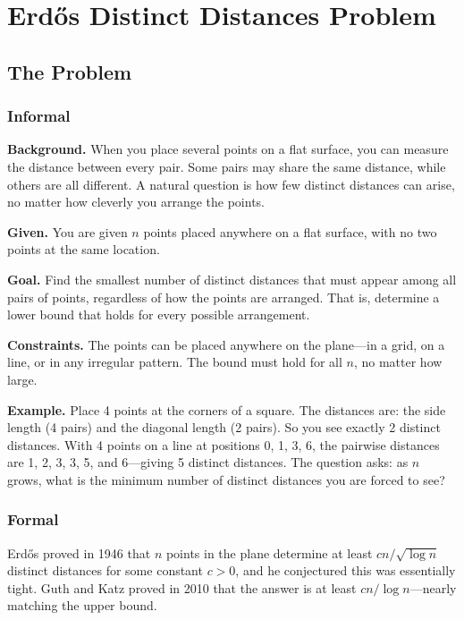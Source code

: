 \let\LocalMacro\relax

\chapter{Erd\H{o}s Distinct Distances Problem}

\section{The Problem}

\subsection{Informal}

\textbf{Background.} When you place several points on a flat surface, you can measure the distance between every pair. Some pairs may share the same distance, while others are all different. A natural question is how few distinct distances can arise, no matter how cleverly you arrange the points.

\textbf{Given.} You are given $n$ points placed anywhere on a flat surface, with no two points at the same location.

\textbf{Goal.} Find the smallest number of distinct distances that must appear among all pairs of points, regardless of how the points are arranged. That is, determine a lower bound that holds for every possible arrangement.

\textbf{Constraints.} The points can be placed anywhere on the plane---in a grid, on a line, or in any irregular pattern. The bound must hold for all $n$, no matter how large.

\textbf{Example.} Place 4 points at the corners of a square. The distances are: the side length (4 pairs) and the diagonal length (2 pairs). So you see exactly 2 distinct distances. With 4 points on a line at positions 0, 1, 3, 6, the pairwise distances are 1, 2, 3, 3, 5, and 6---giving 5 distinct distances. The question asks: as $n$ grows, what is the minimum number of distinct distances you are forced to see?

\subsection{Formal}
Erd\H{o}s proved in 1946 that $n$ points in the plane determine at least $cn/\sqrt{\log n}$ distinct distances for some constant $c > 0$, and he conjectured this was essentially tight. Guth and Katz proved in 2010 that the answer is at least $cn/\log n$---nearly matching the upper bound.

